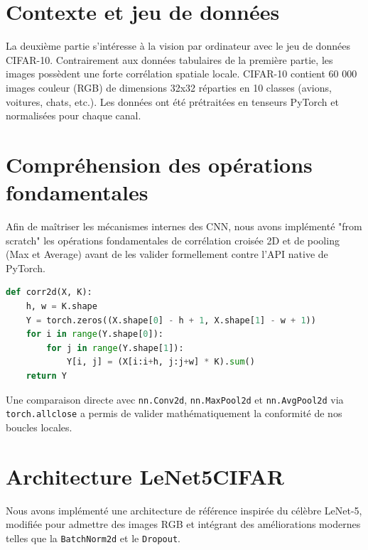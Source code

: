 
\section{Contexte et jeu de données}

La deuxième partie s'intéresse à la vision par ordinateur avec le jeu de données CIFAR-10. Contrairement aux données tabulaires de la première partie, les images possèdent une forte corrélation spatiale locale. CIFAR-10 contient 60 000 images couleur (RGB) de dimensions 32x32 réparties en 10 classes (avions, voitures, chats, etc.). Les données ont été prétraitées en tenseurs PyTorch et normalisées pour chaque canal.

\section{Compréhension des opérations fondamentales}

Afin de maîtriser les mécanismes internes des CNN, nous avons implémenté "from scratch" les opérations fondamentales de corrélation croisée 2D et de pooling (Max et Average) avant de les valider formellement contre l'API native de PyTorch.

\begin{lstlisting}[language=Python, caption=Implémentation manuelle de la corrélation 2D (\texttt{corr2d})]
def corr2d(X, K):
    h, w = K.shape
    Y = torch.zeros((X.shape[0] - h + 1, X.shape[1] - w + 1))
    for i in range(Y.shape[0]):
        for j in range(Y.shape[1]):
            Y[i, j] = (X[i:i+h, j:j+w] * K).sum()
    return Y
\end{lstlisting}

Une comparaison directe avec \texttt{nn.Conv2d}, \texttt{nn.MaxPool2d} et \texttt{nn.AvgPool2d} via \texttt{torch.allclose} a permis de valider mathématiquement la conformité de nos boucles locales.

\section{Architecture LeNet5CIFAR}

Nous avons implémenté une architecture de référence inspirée du célèbre LeNet-5, modifiée pour admettre des images RGB et intégrant des améliorations modernes telles que la \texttt{BatchNorm2d} et le \texttt{Dropout}.

